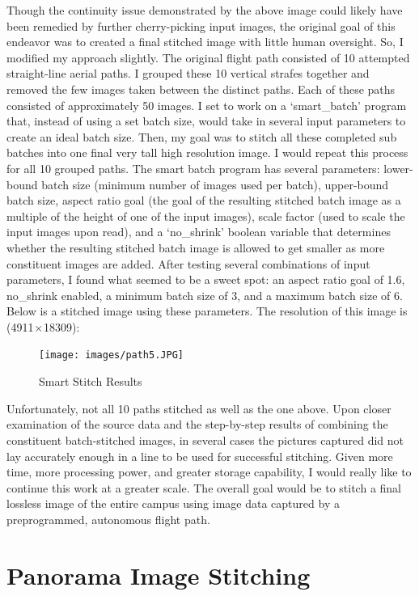 Though the continuity issue demonstrated by the above image could likely have been remedied by further cherry-picking input images, the original goal of this endeavor was to created a final stitched image with little human oversight. So, I modified my approach slightly. The original flight path consisted of 10 attempted straight-line aerial paths. I grouped these 10 vertical strafes together and removed the few images taken between the distinct paths. Each of these paths consisted of approximately 50 images. I set to work on a `smart\_batch' program that, instead of using a set batch size, would take in several input parameters to create an ideal batch size. Then, my goal was to stitch all these completed sub batches into one final very tall high resolution image. I would repeat this process for all 10 grouped paths. The smart batch program has several parameters: lower-bound batch size (minimum number of images used per batch), upper-bound batch size, aspect ratio goal (the goal of the resulting stitched batch image as a multiple of the height of one of the input images), scale factor (used to scale the input images upon read), and a `no\_shrink' boolean variable that determines whether the resulting stitched batch image is allowed to get smaller as more constituent images are added. After testing several combinations of input parameters, I found what seemed to be a sweet spot: an aspect ratio goal of 1.6, no\_shrink enabled, a minimum batch size of 3, and a maximum batch size of 6. Below is a stitched image using these parameters. The resolution of this image is (4911 × 18309):

\begin{figure}[htbp]
\centering
\texttt{[image: images/path5.JPG]}
\caption{Smart Stitch Results}
\end{figure}

Unfortunately, not all 10 paths stitched as well as the one above. Upon closer examination of the source data and the step-by-step results of combining the constituent batch-stitched images, in several cases the pictures captured did not lay accurately enough in a line to be used for successful stitching. Given more time, more processing power, and greater storage capability, I would really like to continue this work at a greater scale. The overall goal would be to stitch a final lossless image of the entire campus using image data captured by a preprogrammed, autonomous flight path.

\chapter{Panorama Image Stitching}
\label{panoramaimagestitching}

